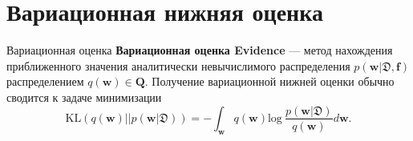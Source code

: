 \documentclass[10pt,pdf,utf8,russian,aspectratio=169]{beamer}
\begin{document}
\section{Вариационная нижняя оценка}
\begin{frame}{Вариационная оценка}
\textbf{Вариационная оценка Evidence} --- метод нахождения приближенного значения аналитически невычислимого распределения $p(\mathbf{w}|\mathfrak{D}, \mathbf{f})$ распределением $q(\mathbf{w}) \in \mathbf{Q}$. Получение вариационной нижней оценки обычно сводится к задаче минимизации
$$\text{KL}(q(\mathbf{w})||p(\mathbf{w}| \mathfrak{D}))=
-\int_{\mathbf{w}} q(\mathbf{w}) \text{log}~\frac{p(\mathbf{w}| \mathfrak{D})} {q(\mathbf{w})}d\mathbf{w}.
$$

\begin{figure}
  \centering
\label{fig:1}\qquad

\end{figure}

\end{frame}
\end{document}
